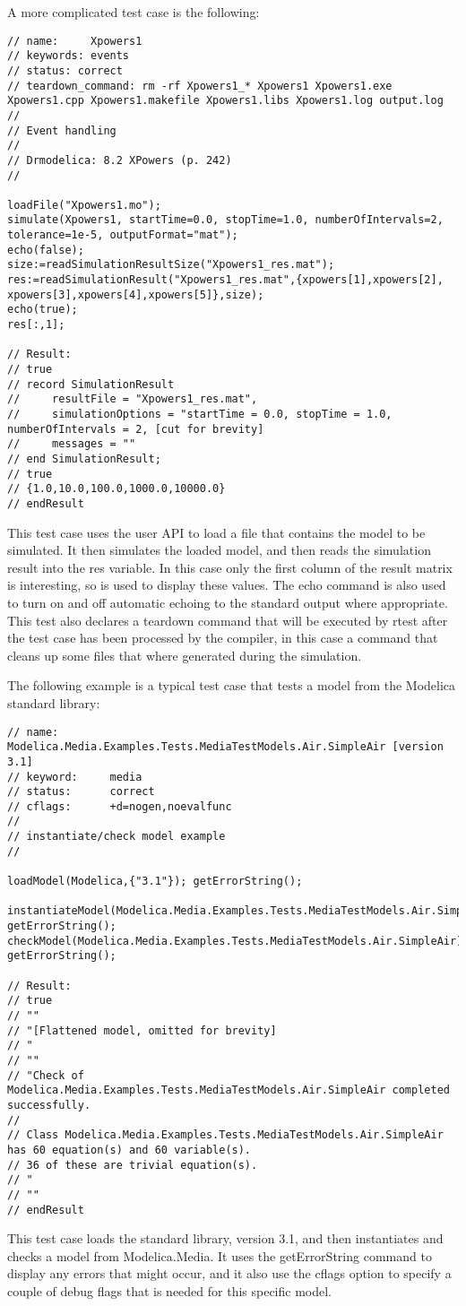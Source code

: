 A more complicated test case is the following:
\begin{lstlisting}[language=modelica]
// name:     Xpowers1
// keywords: events
// status: correct
// teardown_command: rm -rf Xpowers1_* Xpowers1 Xpowers1.exe Xpowers1.cpp Xpowers1.makefile Xpowers1.libs Xpowers1.log output.log
//
// Event handling
//
// Drmodelica: 8.2 XPowers (p. 242)
// 

loadFile("Xpowers1.mo");
simulate(Xpowers1, startTime=0.0, stopTime=1.0, numberOfIntervals=2, tolerance=1e-5, outputFormat="mat");
echo(false);
size:=readSimulationResultSize("Xpowers1_res.mat");
res:=readSimulationResult("Xpowers1_res.mat",{xpowers[1],xpowers[2], xpowers[3],xpowers[4],xpowers[5]},size);
echo(true);
res[:,1];

// Result:
// true
// record SimulationResult
//     resultFile = "Xpowers1_res.mat",
//     simulationOptions = "startTime = 0.0, stopTime = 1.0, numberOfIntervals = 2, [cut for brevity]
//     messages = ""
// end SimulationResult;
// true
// {1.0,10.0,100.0,1000.0,10000.0}
// endResult
\end{lstlisting}
This test case uses the user API to load a file that contains the model to be
simulated. It then simulates the loaded model, and then reads the simulation
result into the res variable. In this case only the first column of the result
matrix is interesting, so  is used to display these values.
The echo command is also used to turn on and off automatic echoing to the
standard output where appropriate. This test also declares a teardown command
that will be executed by rtest after the test case has been processed by the
compiler, in this case a command that cleans up some files that where generated
during the simulation.

The following example is a typical test case that tests a model from the
Modelica standard library:
\begin{lstlisting}[language=modelica]
// name:        Modelica.Media.Examples.Tests.MediaTestModels.Air.SimpleAir [version 3.1]
// keyword:     media
// status:      correct
// cflags:      +d=nogen,noevalfunc
//
// instantiate/check model example
//

loadModel(Modelica,{"3.1"}); getErrorString();

instantiateModel(Modelica.Media.Examples.Tests.MediaTestModels.Air.SimpleAir); getErrorString();
checkModel(Modelica.Media.Examples.Tests.MediaTestModels.Air.SimpleAir); getErrorString();

// Result:
// true
// ""
// "[Flattened model, omitted for brevity]
// "
// ""
// "Check of Modelica.Media.Examples.Tests.MediaTestModels.Air.SimpleAir completed successfully.
// 
// Class Modelica.Media.Examples.Tests.MediaTestModels.Air.SimpleAir has 60 equation(s) and 60 variable(s).
// 36 of these are trivial equation(s).
// "
// ""
// endResult
\end{lstlisting}
This test case loads the standard library, version 3.1, and then instantiates
and checks a model from Modelica.Media. It uses the getErrorString command to
display any errors that might occur, and it also use the cflags option to
specify a couple of debug flags that is needed for this specific model.
